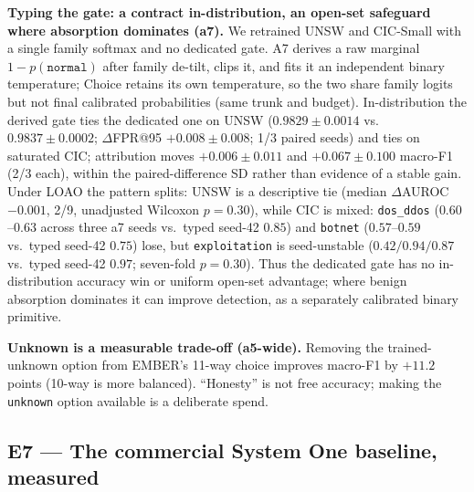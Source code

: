 \documentclass[sigconf,anonymous=false]{acmart}
\begin{document}
\textbf{Typing the gate: a contract in-distribution, an open-set safeguard where absorption dominates (a7).} We retrained UNSW and CIC-Small with a single family softmax and no dedicated gate. A7 derives a raw marginal $1-p(\texttt{normal})$ after family de-tilt, clips it, and fits it an independent binary temperature; Choice retains its own temperature, so the two share family logits but not final calibrated probabilities (same trunk and budget). In-distribution the derived gate ties the dedicated one on UNSW ($0.9829\pm0.0014$ vs.\ $0.9837\pm0.0002$; $\Delta$FPR@95 $+0.008\pm0.008$; 1/3 paired seeds) and ties on saturated CIC; attribution moves $+0.006\pm0.011$ and $+0.067\pm0.100$ macro-F1 (2/3 each), within the paired-difference SD rather than evidence of a stable gain. Under LOAO the pattern splits: UNSW is a descriptive tie (median $\Delta$AUROC $-0.001$, 2/9, unadjusted Wilcoxon $p{=}0.30$), while CIC is mixed: \texttt{dos\_ddos} ($0.60$--$0.63$ across three a7 seeds vs.\ typed seed-42 $0.85$) and \texttt{botnet} ($0.57$--$0.59$ vs.\ typed seed-42 $0.75$) lose, but \texttt{exploitation} is seed-unstable ($0.42/0.94/0.87$ vs.\ typed seed-42 $0.97$; seven-fold $p{=}0.30$). Thus the dedicated gate has no in-distribution accuracy win or uniform open-set advantage; where benign absorption dominates it can improve detection, as a separately calibrated binary primitive.

\textbf{Unknown is a measurable trade-off (a5-wide).} Removing the trained-unknown option from EMBER's 11-way choice improves macro-F1 by $+11.2$ points (10-way is more balanced). ``Honesty'' is not free accuracy; making the \texttt{unknown} option available is a deliberate spend.

\subsection{E7 --- The commercial System One baseline, measured}
\label{sec:e7}
\end{document}
